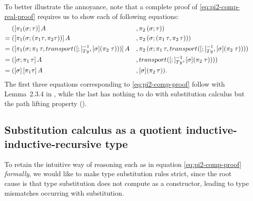 \documentclass[a4paper,UKenglish,numberwithinsect,cleveref,thm-restate]{lipics-v2021}
\begin{document}
\begin{example}
  To better illustrate the annoyance, note that a complete proof of \eqref{eq:pi2-comp-real-proof} requires us to show each of following equations:
  \begin{alignat*}{3}
         & ([\pi_1(\sigma; \tau)]\,A                    &&, \pi_2\,(\sigma ; \tau)) \\
    = {} & ([\pi_1(\sigma; (\pi_1\tau , \pi_2\tau))]\,A &&, \pi_2\,(\sigma; (\pi_1\,\tau, \pi_2\,\tau))) \\
    = {} & ([\pi_1(\sigma;\pi_1\,\tau, \transfib{}{[;]_{\Ty}^{-1}}{\color{black}[ \sigma ] (\pi_2\;\tau)})]\,A &&, \pi_2\,(\sigma;\pi_1\,\tau, \transfib{}{[;]_{\Ty}^{-1}}{\color{black}[ \sigma ] (\pi_2\;\tau)})) \\
    = {} & ([\sigma;\pi_1\,\tau]\,A &&, \transfib{}{[;]_{\Ty}^{-1}}{\color{black}[ \sigma ] (\pi_2\;\tau)})) \nonumber \\
    = {} & (\sub{\sigma}{\sub{\pi_1\tau}{A}} &&, [\sigma] (\pi_2\,\tau)). \nonumber
  \end{alignat*}
  The first three equations corresponding to \eqref{eq:pi2-comp-proof} follow with Lemma~2.3.4 in \cite{UFP2013}, while the last has nothing to do with substitution calculus but the path lifting property (\cite[Lemma~2.3.2]{UFP2013}).
\end{example}

\subsection{Substitution calculus as a quotient inductive-inductive-recursive type} \label{subsec:SC-QIIRT}

To retain the intuitive way of reasoning such as in equation \eqref{eq:pi2-comp-proof} \emph{formally}, we would like to make type substitution rules strict, since the root cause is that type substitution does not compute as a constructor, leading to type mismatches occurring with substitution.
\end{document}
